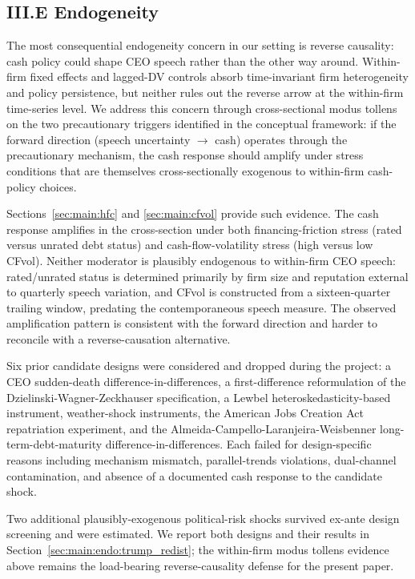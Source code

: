 \subsection*{III.E Endogeneity}
\label{sec:main:endo}

The most consequential endogeneity concern in our setting is reverse causality: cash policy could shape CEO speech rather than the other way around. Within-firm fixed effects and lagged-DV controls absorb time-invariant firm heterogeneity and policy persistence, but neither rules out the reverse arrow at the within-firm time-series level. We address this concern through cross-sectional modus tollens on the two precautionary triggers identified in the conceptual framework: if the forward direction (speech uncertainty $\to$ cash) operates through the precautionary mechanism, the cash response should amplify under stress conditions that are themselves cross-sectionally exogenous to within-firm cash-policy choices.

Sections~\ref{sec:main:hfc} and \ref{sec:main:cfvol} provide such evidence. The cash response amplifies in the cross-section under both financing-friction stress (rated versus unrated debt status) and cash-flow-volatility stress (high versus low CFvol). Neither moderator is plausibly endogenous to within-firm CEO speech: rated/unrated status is determined primarily by firm size and reputation external to quarterly speech variation, and CFvol is constructed from a sixteen-quarter trailing window, predating the contemporaneous speech measure. The observed amplification pattern is consistent with the forward direction and harder to reconcile with a reverse-causation alternative.

Six prior candidate designs were considered and dropped during the project: a CEO sudden-death difference-in-differences, a first-difference reformulation of the Dzielinski-Wagner-Zeckhauser specification, a Lewbel heteroskedasticity-based instrument, weather-shock instruments, the American Jobs Creation Act repatriation experiment, and the Almeida-Campello-Laranjeira-Weisbenner long-term-debt-maturity difference-in-differences. Each failed for design-specific reasons including mechanism mismatch, parallel-trends violations, dual-channel contamination, and absence of a documented cash response to the candidate shock.

Two additional plausibly-exogenous political-risk shocks survived ex-ante design screening and were estimated. We report both designs and their results in Section~\ref{sec:main:endo:trump_redist}; the within-firm modus tollens evidence above remains the load-bearing reverse-causality defense for the present paper.

